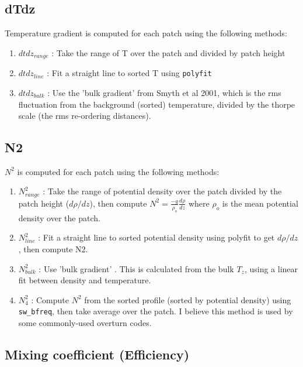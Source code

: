 \documentclass[11pt]{article}
\begin{document}
\subsection{dTdz}

Temperature gradient is computed for each patch using the following methods:
\begin{enumerate}
\item $dtdz_{range}$ : Take the range of T over the patch and divided by patch height
\item $dtdz_{line}$ : Fit a straight line to sorted T using \verb+polyfit+
\item $dtdz_{bulk}$ : Use the 'bulk gradient' from Smyth et al 2001, which is the rms fluctuation from the background (sorted) temperature, divided by the thorpe scale (the rms re-ordering distances).
\end{enumerate}


\subsection{N2}

$N^2$ is computed for each patch using the following methods:
\begin{enumerate}
\item $N^2_{range}$ : Take the range of potential density over the patch divided by the patch height ($d\rho/dz$), then compute $N^2=\frac{-g}{\rho_o}\frac{d\rho}{dz}$ where $\rho_o$ is the mean potential density over the patch.
\item $N^2_{line}$ : Fit a straight line to sorted potential density using polyfit to get $d\rho/dz$, then compute N2.
\item $N^2_{bulk}$ : Use 'bulk gradient' . This is calculated from the bulk $T_z$, using a linear fit between density and temperature.
\item $N^2_4$ : Compute $N^2$ from the sorted profile (sorted by potential density) using \verb+sw_bfreq+, then take average over the patch. I believe this method is used by some commonly-used overturn codes.
\end{enumerate}


\subsection{Mixing coefficient (Efficiency)}
\end{document}
